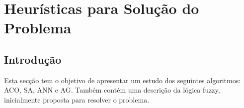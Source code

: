 \chapter{Heurísticas para Solução do Problema}\label{cap:heuristicas}

\section{Introdução}

Esta secção tem o objetivo de apresentar um estudo dos seguintes algoritmos:
ACO, SA, ANN e AG\@. Também contém uma descrição da lógica fuzzy, inicialmente
proposta para resolver o problema.



